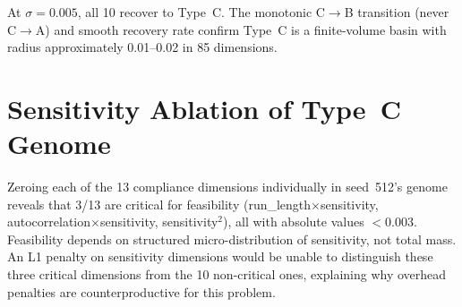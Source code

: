 \documentclass[twoside]{article}
\begin{document}
At $\sigma = 0.005$, all 10 recover to Type~C. The monotonic C$\to$B transition
(never C$\to$A) and smooth recovery rate confirm Type~C is a finite-volume basin
with radius approximately 0.01--0.02 in 85 dimensions.

\section{Sensitivity Ablation of Type~C Genome}
\label{app:ablation}

Zeroing each of the 13 compliance dimensions individually in seed~512's genome
reveals that 3/13 are critical for feasibility (run\_length$\times$sensitivity,
autocorrelation$\times$sensitivity, sensitivity$^2$), all with absolute
values $<$0.003. Feasibility depends on structured micro-distribution of
sensitivity, not total mass. An L1 penalty on sensitivity dimensions would be
unable to distinguish these three critical dimensions from the 10 non-critical
ones, explaining why overhead penalties are counterproductive for this problem.



\end{document}
